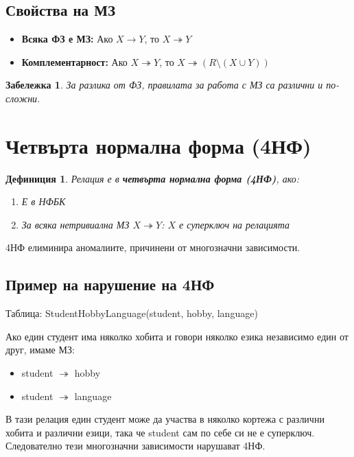 \documentclass{scrartcl}
\newtheorem{definition}{Дефиниция}
\newtheorem{remark}{Забележка}
\begin{document}
\begin{FlushLeft}
\subsection{Свойства на МЗ}

\begin{itemize}
    \item \textbf{Всяка ФЗ е МЗ:} Ако $X \rightarrow Y$, то $X \twoheadrightarrow Y$
    
    \item \textbf{Комплементарност:} Ако $X \twoheadrightarrow Y$, то $X \twoheadrightarrow (R \setminus (X \cup Y))$
\end{itemize}

\begin{remark}
За разлика от ФЗ, правилата за работа с МЗ са различни и по-сложни.
\end{remark}

\section{Четвърта нормална форма (4НФ)}

\begin{definition}
Релация е в \textbf{\textit{четвърта нормална форма (4НФ)}}, ако:
\begin{enumerate}
    \item Е в НФБК
    \item За всяка нетривиална МЗ $X \twoheadrightarrow Y$: $X$ е суперключ на релацията
\end{enumerate}
\end{definition}

4НФ елиминира аномалиите, причинени от многозначни зависимости.

\subsection{Пример на нарушение на 4НФ}

Таблица: StudentHobbyLanguage(student, hobby, language)

Ако един студент има няколко хобита и говори няколко езика независимо един от друг, имаме МЗ:
\begin{itemize}
    \item student $\twoheadrightarrow$ hobby
    \item student $\twoheadrightarrow$ language
\end{itemize}

В тази релация един студент може да участва в няколко кортежа с различни хобита и различни езици, така че student сам по себе си не е суперключ. Следователно тези многозначни зависимости нарушават 4НФ.


\end{FlushLeft}
\end{document}
